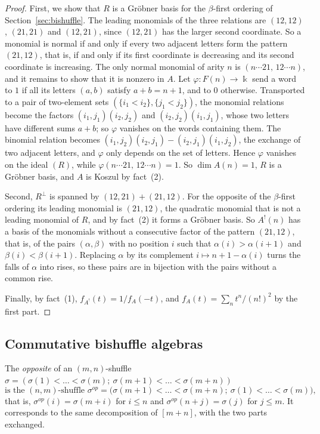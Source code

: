 \documentclass[11pt]{amsart}
\theoremstyle{definition}
\theoremstyle{remark}
\newcommand{\kk}{\Bbbk}
\begin{document}
\begin{proof}
First, we show that $R$ is a Gr\"obner basis for the $\beta$-first ordering of Section~\ref{sec:bishuffle}. The leading monomials of the three relations are $(12,12)$, $(21,21)$ and $(12,21)$, since $(12,21)$ has the larger second coordinate. So a monomial is normal if and only if every two adjacent letters form the pattern $(21,12)$, that is, if and only if its first coordinate is decreasing and its second coordinate is increasing. The only normal monomial of arity $n$ is $(n\cdots21,\,12\cdots n)$, and it remains to show that it is nonzero in $A$. Let $\varphi\colon F(n)\to\kk$ send a word to $1$ if all its letters $(a,b)$ satisfy $a+b=n+1$, and to $0$ otherwise. Transported to a pair of two-element sets $(\{i_1<i_2\},\{j_1<j_2\})$, the monomial relations become the factors $(i_1,j_1)(i_2,j_2)$ and $(i_2,j_2)(i_1,j_1)$, whose two letters have different sums $a+b$; so $\varphi$ vanishes on the words containing them. The binomial relation becomes $(i_1,j_2)(i_2,j_1)-(i_2,j_1)(i_1,j_2)$, the exchange of two adjacent letters, and $\varphi$ only depends on the set of letters. Hence $\varphi$ vanishes on the ideal $(R)$, while $\varphi(n\cdots21,\,12\cdots n)=1$. So $\dim A(n)=1$, $R$ is a Gr\"obner basis, and $A$ is Koszul by fact~(2).

Second, $R^\perp$ is spanned by $(12,21)+(21,12)$. For the opposite of the $\beta$-first ordering its leading monomial is $(21,12)$, the quadratic monomial that is not a leading monomial of $R$, and by fact~(2) it forms a Gr\"obner basis. So $A^!(n)$ has a basis of the monomials without a consecutive factor of the pattern $(21,12)$, that is, of the pairs $(\alpha,\beta)$ with no position $i$ such that $\alpha(i)>\alpha(i+1)$ and $\beta(i)<\beta(i+1)$. Replacing $\alpha$ by its complement $i\mapsto n+1-\alpha(i)$ turns the falls of $\alpha$ into rises, so these pairs are in bijection with the pairs without a common rise.

Finally, by fact~(1), $f_{A^!}(t)=1/f_A(-t)$, and $f_A(t)=\sum_nt^n/(n!)^2$ by the first part.
\end{proof}

\subsection{Commutative bishuffle algebras}\label{sec:commutative}

The \emph{opposite} of an $(m,n)$-shuffle \\ $\sigma=(\sigma(1)<\dots<\sigma(m);\ \sigma(m+1)<\dots<\sigma(m+n))$ 
\[
\text{is the $(n,m)$-shuffle }
\sigma^{op}=\bigl(\sigma(m+1)<\dots<\sigma(m+n);\ \sigma(1)<\dots<\sigma(m)\bigr),
\]
that is, $\sigma^{op}(i)=\sigma(m+i)$ for $i\le n$ and $\sigma^{op}(n+j)=\sigma(j)$ for $j\le m$. It corresponds to the same decomposition of $[m+n]$, with the two parts exchanged.
\end{document}
